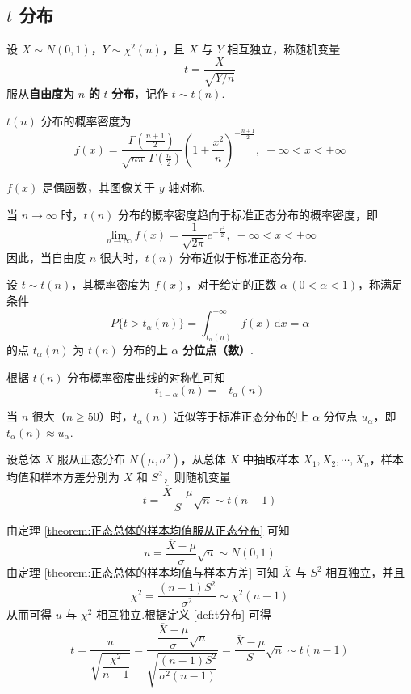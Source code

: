 \subsection{\texorpdfstring{$t$}{} 分布}

\begin{definition} \label{def:t分布}
    设 $X \sim N(0,1)$，$Y \sim \chi^2(n)$，且 $X$ 与 $Y$ 相互独立，称随机变量
    $$
    t = \dfrac{X}{\sqrt{Y/n}}
    $$
    服从\textbf{自由度为} $n$ \textbf{的} $t$ \textbf{分布}，记作 $t \sim t(n)$.
\end{definition}

$t(n)$ 分布的概率密度为
$$
f(x) = \dfrac{\Gamma(\frac{n+1}{2})}{\sqrt{n \pi} \, \Gamma(\frac{n}{2})} \left( 1 + \dfrac{x^2}{n} \right)^{-\frac{n+1}{2}}, \; -\infty < x < +\infty
$$

$f(x)$ 是偶函数，其图像关于 $y$ 轴对称.

当 $n \to \infty$ 时，$t(n)$ 分布的概率密度趋向于标准正态分布的概率密度，即
$$
\lim_{n \to \infty} f(x) = \dfrac{1}{\sqrt{2 \pi}} e^{-\frac{x^2}{2}}, \; -\infty < x < +\infty
$$
因此，当自由度 $n$ 很大时，$t(n)$ 分布近似于标准正态分布.

\begin{definition}
    设 $t \sim t(n)$，其概率密度为 $f(x)$，对于给定的正数 $\alpha \, (0 < \alpha < 1)$，称满足条件
    $$
    P \{ t > t_{\alpha}(n) \} = \int_{t_{\alpha}(n)}^{+\infty} f(x) \, \text{d}x = \alpha
    $$
    的点 $t_{\alpha}(n)$ 为 $t(n)$ 分布的\textbf{上} $\alpha$ \textbf{分位点（数）}.
\end{definition}

根据 $t(n)$ 分布概率密度曲线的对称性可知
$$
t_{1 - \alpha}(n) = -t_{\alpha}(n)
$$

当 $n$ 很大（$n \geqslant 50$）时，$t_{\alpha}(n)$ 近似等于标准正态分布的上 $\alpha$ 分位点 $u_{\alpha}$，即 $t_{\alpha}(n) \approx u_{\alpha}$.

\begin{theorem}
    设总体 $X$ 服从正态分布 $N(\mu,\sigma^2)$，从总体 $X$ 中抽取样本 $X_1,X_2,\cdots,X_n$，样本均值和样本方差分别为 $\overline{X}$ 和 $S^2$，则随机变量
    $$
    t = \dfrac{\overline{X} - \mu}{S} \sqrt{n} \sim t(n-1)
    $$
\end{theorem}

\begin{myproof}
    由定理 \ref{theorem:正态总体的样本均值服从正态分布} 可知
    $$
    u = \dfrac{\overline{X} - \mu}{\sigma} \sqrt{n} \sim N(0,1)
    $$
    由定理 \ref{theorem:正态总体的样本均值与样本方差} 可知 $\overline{X}$ 与 $S^2$ 相互独立，并且
    $$
    \chi^2 = \dfrac{(n-1) S^2}{\sigma^2} \sim \chi^2(n-1)
    $$
    从而可得 $u$ 与 $\chi^2$ 相互独立.根据定义 \ref{def:t分布} 可得
    $$
    t = \dfrac{u}{\sqrt{\dfrac{\chi^2}{n-1}}} = \dfrac{\dfrac{\overline{X} - \mu}{\sigma} \sqrt{n}}{\sqrt{\dfrac{(n-1) S^2}{\sigma^2 (n-1)}}} = \dfrac{\overline{X} - \mu}{S} \sqrt{n} \sim t(n-1)
    $$
\end{myproof}

